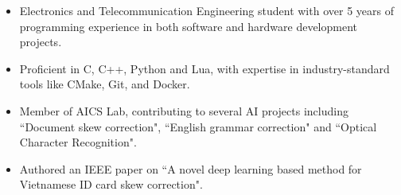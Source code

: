 
\begin{cvparagraph}
  \begin{itemize}
    \item Electronics and Telecommunication Engineering student with over 5 years of programming experience in both software and hardware development projects.
    \item Proficient in C, C++, Python and Lua, with expertise in industry-standard tools like CMake, Git, and Docker.
    \item Member of AICS Lab, contributing to several AI projects including ``Document skew correction", ``English grammar correction" and ``Optical Character Recognition".
    \item Authored an IEEE paper on ``A novel deep learning based method for Vietnamese ID card skew correction".
  \end{itemize}



\end{cvparagraph}
